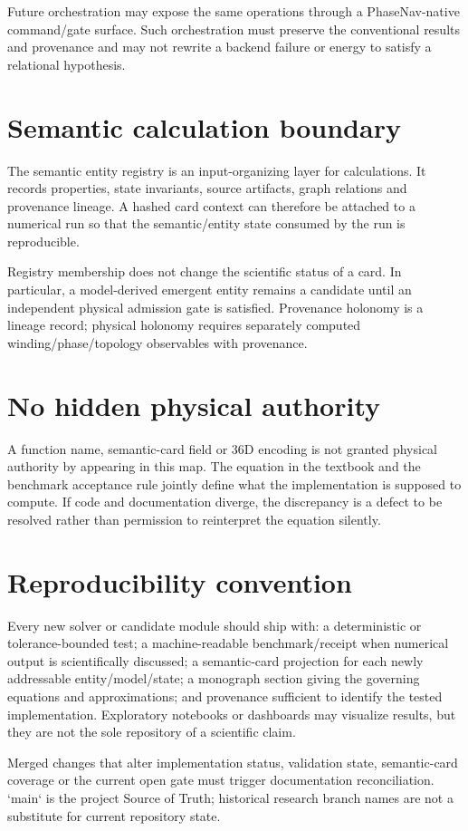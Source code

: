 Future orchestration may expose the same operations through a PhaseNav-native command/gate surface.  Such orchestration must preserve the conventional results and provenance and may not rewrite a backend failure or energy to satisfy a relational hypothesis.

\section{Semantic calculation boundary}
The semantic entity registry is an input-organizing layer for calculations.  It records properties, state invariants, source artifacts, graph relations and provenance lineage.  A hashed card context can therefore be attached to a numerical run so that the semantic/entity state consumed by the run is reproducible.

Registry membership does not change the scientific status of a card.  In particular, a model-derived emergent entity remains a candidate until an independent physical admission gate is satisfied.  Provenance holonomy is a lineage record; physical holonomy requires separately computed winding/phase/topology observables with provenance.

\section{No hidden physical authority}
A function name, semantic-card field or 36D encoding is not granted physical authority by appearing in this map.  The equation in the textbook and the benchmark acceptance rule jointly define what the implementation is supposed to compute.  If code and documentation diverge, the discrepancy is a defect to be resolved rather than permission to reinterpret the equation silently.

\section{Reproducibility convention}
Every new solver or candidate module should ship with: a deterministic or tolerance-bounded test; a machine-readable benchmark/receipt when numerical output is scientifically discussed; a semantic-card projection for each newly addressable entity/model/state; a monograph section giving the governing equations and approximations; and provenance sufficient to identify the tested implementation.  Exploratory notebooks or dashboards may visualize results, but they are not the sole repository of a scientific claim.

Merged changes that alter implementation status, validation state, semantic-card coverage or the current open gate must trigger documentation reconciliation.  `main` is the project Source of Truth; historical research branch names are not a substitute for current repository state.
